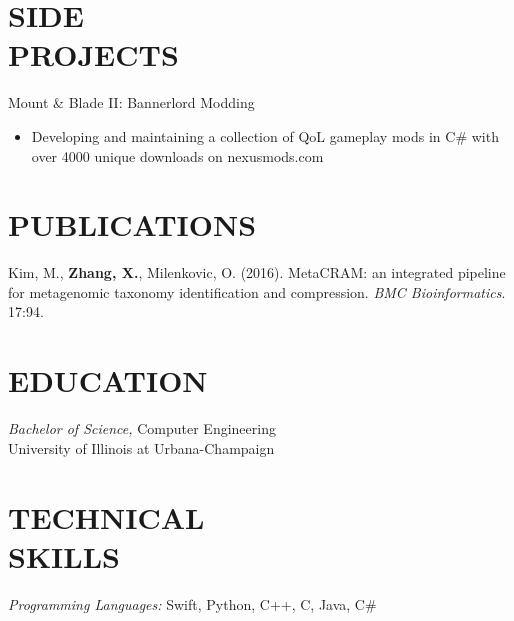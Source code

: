 \documentclass[resmargin]{res}
\begin{document}
\begin{resume}

\section{SIDE\\PROJECTS}
	Mount \& Blade II: Bannerlord Modding
	\begin{itemize}
	\vspace{1mm}
		 \item Developing and maintaining a collection of QoL gameplay mods in C\# with over 4000 unique downloads on nexusmods.com
	\end{itemize}
\section{PUBLICATIONS}
	\textnormal{Kim, M., \textbf{Zhang, X.}, Milenkovic, O. (2016). MetaCRAM: an integrated pipeline for metagenomic taxonomy identification and compression. \textit{BMC Bioinformatics}. 17:94.}

\section{EDUCATION} {\sl Bachelor of Science,} Computer Engineering \\
                University of Illinois at Urbana-Champaign

\section{TECHNICAL \\ SKILLS} 
{\sl Programming Languages:} Swift, Python, C++, C, Java, C\#

\end{resume}
\end{document}
